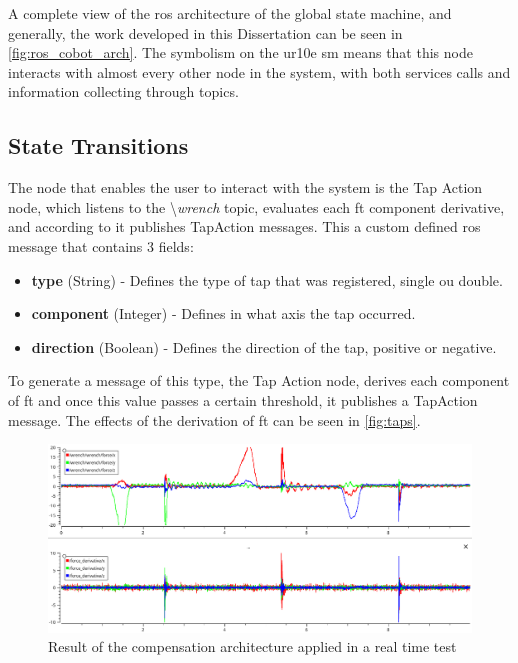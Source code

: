 \par A complete view of the \ac{ros} architecture of the global state machine, and generally, the work developed in this Dissertation can be seen in \autoref{fig:ros_cobot_arch}. The symbolism on the \ac{ur10e} \ac{sm} means that this node interacts with almost every other node in the system, with both services calls and information collecting through topics.



\subsection{State Transitions}
\label{ssec:double_tap}

\par The node that enables the user to interact with the system is the Tap Action node, which listens to the \textbackslash\textit{wrench} topic, evaluates each \ac{ft} component derivative, and according to it publishes TapAction messages. This a custom defined \ac{ros} message that contains 3 fields: 

\begin{itemize}
    \item \textbf{type} (String) - Defines the type of tap that was registered, single ou double.
    \item \textbf{component} (Integer) - Defines in what axis the tap occurred.
    \item \textbf{direction} (Boolean) - Defines the direction of the tap, positive or negative.
\end{itemize}

\par To generate a message of this type, the Tap Action node, derives each component of \ac{ft} and once this value passes a certain threshold, it publishes a TapAction message. The effects of the derivation of \ac{ft} can be seen in \autoref{fig:taps}.


\begin{figure}[h]
    \centering
    \includegraphics[width=0.9\linewidth]{figs/chp5/taps.png}
    \caption{Result of the compensation architecture applied in a real time test}
    \label{fig:taps}
\end{figure}

